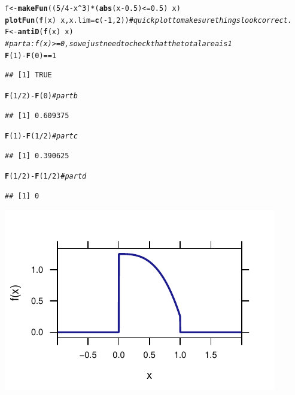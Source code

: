 \documentclass[twoside]{book}\usepackage[]{graphicx}\usepackage[]{xcolor}
\makeatletter
\def\maxwidth{ %
  \ifdim\Gin@nat@width>\linewidth
    \linewidth
  \else
    \Gin@nat@width
  \fi
}
\newcommand{\hlnum}[1]{\textcolor[rgb]{0.686,0.059,0.569}{#1}}%
\newcommand{\hlcom}[1]{\textcolor[rgb]{0.678,0.584,0.686}{\textit{#1}}}%
\newcommand{\hlopt}[1]{\textcolor[rgb]{0,0,0}{#1}}%
\newcommand{\hlstd}[1]{\textcolor[rgb]{0.345,0.345,0.345}{#1}}%
\newcommand{\hlkwb}[1]{\textcolor[rgb]{0.69,0.353,0.396}{#1}}%
\newcommand{\hlkwc}[1]{\textcolor[rgb]{0.333,0.667,0.333}{#1}}%
\newcommand{\hlkwd}[1]{\textcolor[rgb]{0.737,0.353,0.396}{\textbf{#1}}}%
\newenvironment{kframe}{%
 \def\at@end@of@kframe{}%
 \ifinner\ifhmode%
  \def\at@end@of@kframe{\end{minipage}}%
  \begin{minipage}{\columnwidth}%
 \fi\fi%
 \def\FrameCommand##1{\hskip\@totalleftmargin \hskip-\fboxsep
 \colorbox{shadecolor}{##1}\hskip-\fboxsep
     \hskip-\linewidth \hskip-\@totalleftmargin \hskip\columnwidth}%
 \MakeFramed {\advance\hsize-\width
   \@totalleftmargin\z@ \linewidth\hsize
   \@setminipage}}%
 {\par\unskip\endMakeFramed%
 \at@end@of@kframe}
\newenvironment{knitrout}{}{} %
\makeatother
\begin{document}
\begin{solution}
\begin{knitrout}
\color{fgcolor}\begin{kframe}
\begin{alltt}
\hlstd{f} \hlkwb{<-} \hlkwd{makeFun}\hlstd{((}\hlnum{5}\hlopt{/}\hlnum{4} \hlopt{-} \hlstd{x}\hlopt{^}\hlnum{3}\hlstd{)} \hlopt{*} \hlstd{(}\hlkwd{abs}\hlstd{(x} \hlopt{-} \hlnum{0.5}\hlstd{)} \hlopt{<=} \hlnum{0.5}\hlstd{)} \hlopt{~} \hlstd{x)}
\hlkwd{plotFun}\hlstd{(}\hlkwd{f}\hlstd{(x)} \hlopt{~} \hlstd{x,} \hlkwc{x.lim} \hlstd{=} \hlkwd{c}\hlstd{(}\hlopt{-}\hlnum{1}\hlstd{,} \hlnum{2}\hlstd{))}  \hlcom{# quick plot to make sure things look correct.}
\hlstd{F} \hlkwb{<-} \hlkwd{antiD}\hlstd{(}\hlkwd{f}\hlstd{(x)} \hlopt{~} \hlstd{x)}
\hlcom{# part a: f(x) >=0, so we just need to check that the total area is 1}
\hlkwd{F}\hlstd{(}\hlnum{1}\hlstd{)} \hlopt{-} \hlkwd{F}\hlstd{(}\hlnum{0}\hlstd{)} \hlopt{==} \hlnum{1}
\end{alltt}
\begin{verbatim}
## [1] TRUE
\end{verbatim}
\begin{alltt}
\hlkwd{F}\hlstd{(}\hlnum{1}\hlopt{/}\hlnum{2}\hlstd{)} \hlopt{-} \hlkwd{F}\hlstd{(}\hlnum{0}\hlstd{)}  \hlcom{# part b}
\end{alltt}
\begin{verbatim}
## [1] 0.609375
\end{verbatim}
\begin{alltt}
\hlkwd{F}\hlstd{(}\hlnum{1}\hlstd{)} \hlopt{-} \hlkwd{F}\hlstd{(}\hlnum{1}\hlopt{/}\hlnum{2}\hlstd{)}  \hlcom{# part c}
\end{alltt}
\begin{verbatim}
## [1] 0.390625
\end{verbatim}
\begin{alltt}
\hlkwd{F}\hlstd{(}\hlnum{1}\hlopt{/}\hlnum{2}\hlstd{)} \hlopt{-} \hlkwd{F}\hlstd{(}\hlnum{1}\hlopt{/}\hlnum{2}\hlstd{)}  \hlcom{# part d}
\end{alltt}
\begin{verbatim}
## [1] 0
\end{verbatim}
\end{kframe}

{\centering \includegraphics[width=\maxwidth]{figures/fig-unnamed-chunk-71-1} 

}
\end{knitrout}
\end{solution}
\end{document}
